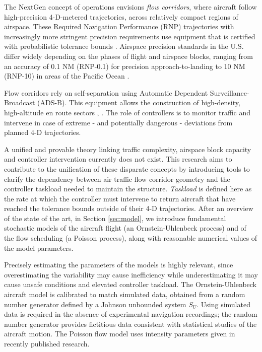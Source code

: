 \documentclass[conference]{IEEEtran}
\begin{document}
The NextGen concept of operations \cite{JPDO:conops07} envisions \emph{flow corridors}, where aircraft follow high-precision 4-D-metered trajectories, across relatively compact regions of airspace. These Required Navigation Performance (RNP) trajectories with increasingly more stringent precision requirements use equipment that is certified with probabilistic tolerance bounds \cite{PBN08}. Airspace precision standards in the U.S. differ widely depending on the phases of flight and airspace blocks, ranging from an accuracy of 0.1 NM (RNP-0.1) for precision approach-to-landing to 10 NM (RNP-10) in areas of the Pacific Ocean \cite{Radio08}.

Flow corridors rely on self-separation using Automatic Dependent Surveillance-Broadcast (ADS-B). This equipment allows the construction of high-density, high-altitude en route sectors \cite{Mun07}, \cite{You10}. The role of controllers is to monitor traffic and intervene in case of extreme - and potentially dangerous - deviations from planned 4-D trajectories. 

A unified and provable theory linking traffic complexity, airspace block capacity and controller intervention currently does not exist. This research aims to contribute to the unification of these disparate concepts by introducing tools to clarify the dependency between air traffic flow corridor geometry and the controller taskload needed to maintain the structure. \emph{Taskload} is defined here as the rate at which the controller must intervene to return aircraft that have reached the tolerance bounds outside of their 4-D trajectories. After an overview of the state of the art, in Section \ref{sec:model}, we introduce fundamental stochastic models of the aircraft flight (an Ornstein-Uhlenbeck process) and of the flow scheduling (a Poisson process), along with reasonable numerical values of the model parameters.

Precisely estimating the parameters of the models is highly relevant, since overestimating the variability may cause inefficiency while underestimating it may cause unsafe conditions and elevated controller taskload. The Ornstein-Uhlenbeck aircraft model is calibrated to match simulated data, obtained from a random number generator defined by a Johnson unbounded system $S_U$. Using simulated data is required in the absence of experimental navigation recordings; the random number generator provides fictitious data consistent with statistical studies of the aircraft motion. The Poisson flow model uses intensity parameters given in recently published research. 
\end{document}
